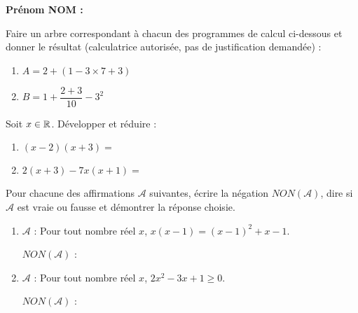 \documentclass[a4paper,11pt,DIV15,BCOR0mm]{scrartcl}
\begin{document}
\noindent\textbf{Prénom NOM : }
\begin{exercice}
Faire un arbre correspondant à chacun des programmes de calcul ci-dessous
et donner le résultat (calculatrice autorisée, pas de justification demandée) :
\begin{enumerate}
  \item $A=2 + (1 - 3\times7 + 3)$ 
  \vfill
  \item $B=1 + \dfrac{2+3}{10} - 3^2$ 
  \vfill  
\end{enumerate}
\end{exercice}

\begin{exercice}
 Soit $x\in\mathbb{R}$. Développer et réduire :
\begin{enumerate}
  \item $(x-2)(x+3)=$
  \vfill
  \item $2(x+3)-7x(x+1)=$
  \vfill
\end{enumerate}

\end{exercice}
\pagebreak
\begin{exercice}
Pour chacune  des affirmations $\mathcal{A}$ suivantes, écrire
la négation $NON(\mathcal{A})$, dire
si $\mathcal{A}$ est vraie ou fausse et démontrer la réponse choisie.
\begin{enumerate}
  \item $\mathcal{A}$ : \og Pour tout nombre réel $x$, $x(x-1)=(x-1)^2+x-1$.\fg
  
  $NON(\mathcal{A})$ : 
  \vfill
  \item $\mathcal{A}$ : \og Pour tout nombre réel $x$, $2x^2-3x+1\geqslant0$. \fg
  
        $NON(\mathcal{A})$ : 
  \vfill
\end{enumerate}
\end{exercice}
\end{document}
